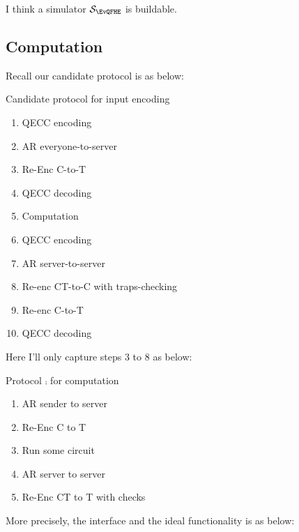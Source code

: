 I think a simulator $\cS_\EvQFHE$ is buildable.

\subsection{Computation}

Recall our candidate protocol is as below:

\begin{protocol}{Candidate protocol for input encoding}
	\begin{enumerate}
		\item QECC encoding
		\item AR everyone-to-server
		\item Re-Enc C-to-T
		\item QECC decoding
		\item Computation
		\item QECC encoding
		\item AR server-to-server
		\item Re-enc CT-to-C with traps-checking
		\item Re-enc C-to-T
		\item QECC decoding
	\end{enumerate}
\end{protocol}

Here I'll only capture steps $3$ to $8$ as below:

\begin{protocol}{Protocol $\comp$ for computation}

	\begin{enumerate}
		\item AR sender to server
		\item Re-Enc C to T
		\item Run some circuit
		\item AR server to server
		\item Re-Enc CT to T with checks
	\end{enumerate}

\end{protocol}

More precisely, the interface and the ideal functionality is as below:

